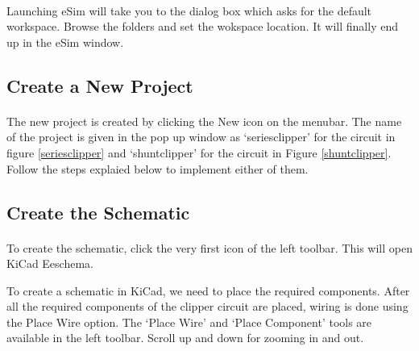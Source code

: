 \paragraph{}
 Launching eSim will take you to the dialog box which asks for the default workspace. Browse the folders and set the wokspace location. It will finally end up in the eSim window.%

\subsection*{Create a New Project}

\paragraph{ } The new project is created by clicking the New icon on the
menubar. The name of the project is given in the pop up window as `seriesclipper' for the circuit in figure \ref{seriesclipper} and `shuntclipper' for the circuit in Figure \ref{shuntclipper}. Follow the steps explaied below to implement either of them.
\subsection*{Create the Schematic}

\paragraph{}  To create the schematic, click the very first icon of the
left toolbar. This will open KiCad Eeschema.


To create a schematic in KiCad, we need to place the required components. After all the required components of the clipper circuit are placed, wiring is
done using the Place Wire option. The `Place Wire' and `Place Component' tools are available in the left toolbar. Scroll up and down for zooming in and out.




